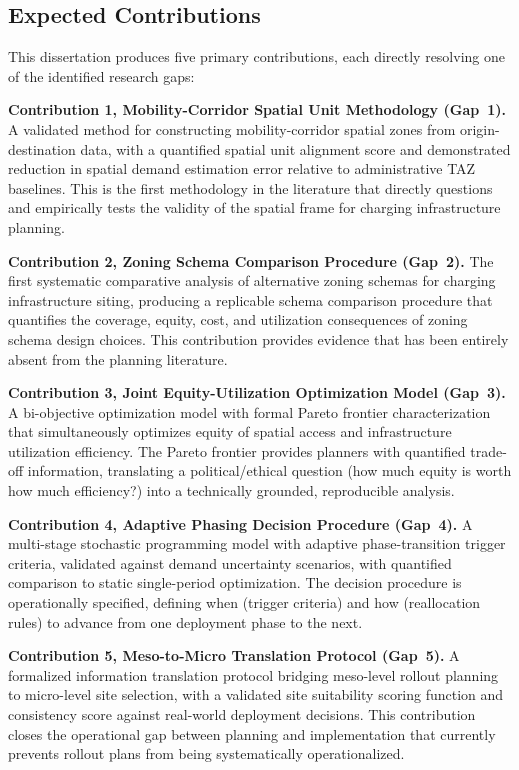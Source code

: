 \documentclass[12pt,letterpaper]{article}
\begin{document}
\subsection{Expected Contributions}

This dissertation produces five primary contributions, each directly
resolving one of the identified research gaps:

\textbf{Contribution 1, Mobility-Corridor Spatial Unit Methodology
(Gap~1).}
A validated method for constructing mobility-corridor spatial zones from
origin-destination data, with a quantified spatial unit alignment score
and demonstrated reduction in spatial demand estimation error relative to
administrative TAZ baselines.  This is the first methodology in the
literature that directly questions and empirically tests the validity of
the spatial frame for charging infrastructure planning.

\textbf{Contribution 2, Zoning Schema Comparison Procedure (Gap~2).}
The first systematic comparative analysis of alternative zoning schemas
for charging infrastructure siting, producing a replicable schema
comparison procedure that quantifies the coverage, equity, cost, and
utilization consequences of zoning schema design choices.  This
contribution provides evidence that has been entirely absent from the
planning literature.

\textbf{Contribution 3, Joint Equity-Utilization Optimization Model
(Gap~3).}
A bi-objective optimization model with formal Pareto frontier
characterization that simultaneously optimizes equity of spatial access
and infrastructure utilization efficiency.  The Pareto frontier provides
planners with quantified trade-off information, translating a
political/ethical question (how much equity is worth how much efficiency?)
into a technically grounded, reproducible analysis.

\textbf{Contribution 4, Adaptive Phasing Decision Procedure (Gap~4).}
A multi-stage stochastic programming model with adaptive phase-transition
trigger criteria, validated against demand uncertainty scenarios, with
quantified comparison to static single-period optimization.  The decision
procedure is operationally specified, defining when (trigger criteria) and
how (reallocation rules) to advance from one deployment phase to the next.

\textbf{Contribution 5, Meso-to-Micro Translation Protocol (Gap~5).}
A formalized information translation protocol bridging meso-level rollout
planning to micro-level site selection, with a validated site suitability
scoring function and consistency score against real-world deployment
decisions.  This contribution closes the operational gap between planning
and implementation that currently prevents rollout plans from being
systematically operationalized.
\end{document}
